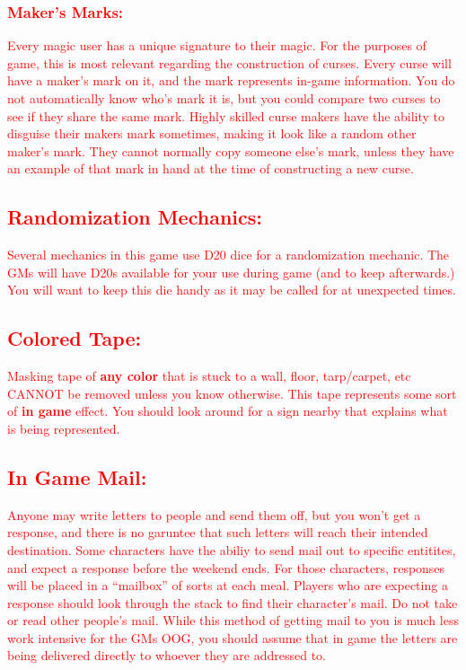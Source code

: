 \documentclass[sheet]{GL2020}
\begin{document}
\textcolor{red}{\subsubsection{Maker's Marks:}}
\textcolor{red}{Every magic user has a unique signature to their magic. For the purposes of game, this is most relevant regarding the construction of curses. Every curse will have a maker's mark on it, and the mark represents in-game information. You do not automatically know who's mark it is, but you could compare two curses to see if they share the same mark. Highly skilled curse makers have the ability to disguise their makers mark sometimes, making it look like a random other maker's mark. They cannot normally copy someone else's mark, unless they have an example of that mark in hand at the time of constructing a new curse.}

\textcolor{red}{\subsection{Randomization Mechanics:}}
\textcolor{red}{Several mechanics in this game use D20 dice for a randomization mechanic. The GMs will have D20s available for your use during game (and to keep afterwards.) You will want to keep this die handy as it may be called for at unexpected times.}

\textcolor{red}{\subsection{Colored Tape:}}
\textcolor{red}{Masking tape of \textbf{any color} that is stuck to a wall, floor, tarp/carpet, etc CANNOT be removed unless you know otherwise. This tape represents some sort of \textbf{in game} effect. You should look around for a sign nearby that explains what is being represented.}

\textcolor{red}{\subsection{In Game Mail:}}
\textcolor{red}{Anyone may write letters to people and send them off, but you won't get a response, and there is no garuntee that such letters will reach their intended destination. Some characters have the abiliy to send mail out to specific entitites, and expect a response before the weekend ends. For those characters, responses will be placed in a ``mailbox'' of sorts at each meal. Players who are expecting a response should look through the stack to find their character's mail. Do not take or read other people's mail. While this method of getting mail to you is much less work intensive for the GMs OOG, you should assume that in game the letters are being delivered directly to whoever they are addressed to.}
\end{document}
